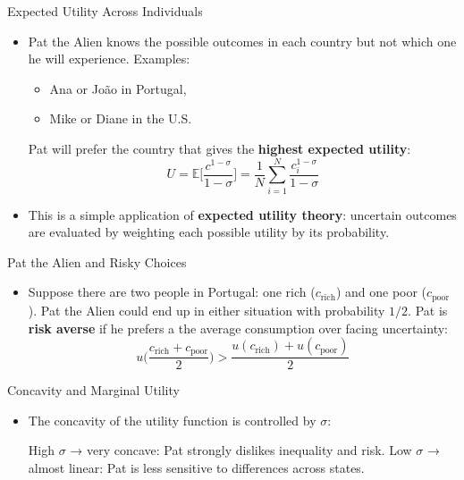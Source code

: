\documentclass[10pt,aspectratio=169]{beamer}
\begin{document}
\begin{frame}{Expected Utility Across Individuals}
\begin{itemize}
  \item Pat the Alien knows the possible outcomes in each country but not which one he will experience.
  \itemvso Examples:
  \begin{itemize}
    \item Ana or João in Portugal,
    \item Mike or Diane in the U.S.
  \end{itemize}

  \itemvso Pat will prefer the country that gives the \textbf{highest expected utility}:
  \[
  U = \mathbb{E}\Big[
  \frac{c^{1-\sigma}}{1-\sigma}
  \Big]
  = \frac{1}{N} \sum_{i=1}^N \frac{c_i^{1-\sigma}}{1-\sigma}
  \]

  \item This is a simple application of \textbf{expected utility theory}: uncertain outcomes are evaluated by weighting each possible utility by its probability.
\end{itemize}
\end{frame}


\begin{frame}{Pat the Alien and Risky Choices}
\begin{itemize}
  \item Suppose there are two people in Portugal: one rich (\(c_{\text{rich}}\)) and one poor (\(c_{\text{poor}}\)).
  \itemvso Pat the Alien could end up in either situation with probability \(1/2\).
  \itemvso Pat is \textbf{risk averse} if he prefers a the average consumption over facing uncertainty:
  \[
  u\Big(\frac{c_{\text{rich}} + c_{\text{poor}}}{2}\Big) 
  > \frac{u(c_{\text{rich}}) + u(c_{\text{poor}})}{2}
  \]
\end{itemize}
\end{frame}

\begin{frame}{Concavity and Marginal Utility}
\begin{itemize}
  \item The concavity of the utility function is controlled by \(\sigma\):
  \begin{itemize}
    \itemvso High \(\sigma\) → very concave: Pat strongly dislikes inequality and risk.
    \itemvso Low \(\sigma\) → almost linear: Pat is less sensitive to differences across states.
  \end{itemize}

\end{itemize}
\end{frame}
\end{document}
